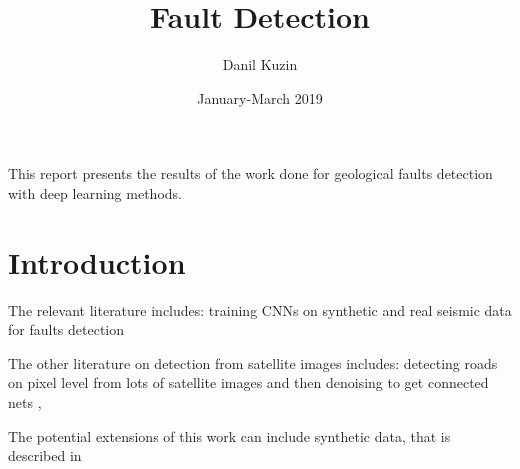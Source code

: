\documentclass[11pt,a4paper]{article}
\begin{document}
\title{Fault Detection}
\author{Danil Kuzin}
\date{January-March 2019}
\maketitle

\abstract
This report presents the results of the work done for geological faults detection with deep learning methods.



\section{Introduction}

The relevant literature includes: training CNNs on synthetic and real seismic data for faults detection \cite{pochet2018seismic, araya2017automated, xiong2018seismic, chehrazi2013seismic, lu2018using}

The other literature on detection from satellite images includes: detecting roads on pixel level from lots of satellite images and then denoising to get connected nets \cite{mnih2010learning},

The potential extensions of this work can include synthetic data, that is described in \cite{hale2014}


\printbibliography
\end{document}
